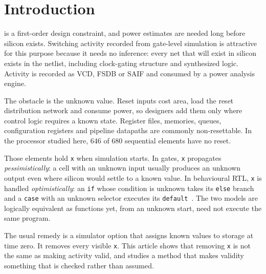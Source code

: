\documentclass[journal]{IEEEtran}
\newcommand{\X}{\texttt{x}}
\begin{document}
\section{Introduction}

 is a first-order design constraint, and power estimates
are needed long before silicon exists. Switching activity recorded from
gate-level simulation is attractive for this purpose because it needs no
inference: every net that will exist in silicon exists in the netlist, including
clock-gating structure and synthesized logic. Activity is recorded as VCD, FSDB
or SAIF and consumed by a power analysis engine.

The obstacle is the unknown value. Reset inputs cost area, load the reset
distribution network and consume power, so designers add them only where control
logic requires a known state. Register files, memories, queues, configuration
registers and pipeline datapaths are commonly non-resettable. In the processor
studied here, 646 of 680 sequential elements have no reset.

Those elements hold \X{} when simulation starts. In gates, \X{} propagates
\emph{pessimistically}: a cell with an unknown input usually produces an unknown
output even where silicon would settle to a known value. In behavioural RTL,
\X{} is handled \emph{optimistically}: an \texttt{if} whose condition is unknown
takes its \texttt{else} branch and a \texttt{case} with an unknown selector
executes its \texttt{default}~\cite{ieee1364,ieee1800}. The two models are
logically equivalent as functions yet, from an unknown start, need not execute
the same program.

The usual remedy is a simulator option that assigns known values to storage at
time zero. It removes every visible \X. This article shows that removing \X{} is
not the same as making activity valid, and studies a method that makes validity
something that is checked rather than assumed.
\end{document}
